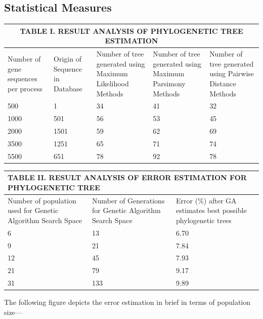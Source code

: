 \documentclass[preprint,12pt]{elsarticle}
\begin{document}
\subsection{Statistical Measures}
\begin{center}

\begin{tabular}{ |p{2.8cm}|p{2.8cm}|p{2.8cm}|p{2.8cm}|p{2.8cm}|  }
 \hline
 \multicolumn{5}{|c|}{\textbf{TABLE I. 	RESULT ANALYSIS OF PHYLOGENETIC TREE ESTIMATION}} \\
 \hline
Number of gene sequences per process & Origin of Sequence in Database&Number of tree generated using Maximum Likelihood Methods&Number of tree generated using Maximum Parsimony Methods& Number of tree generated using Pairwise Distance Methods\\
 \hline
 500 & 1 & 34 & 41 & 32\\
 1000 & 501 & 56 & 53 & 45\\
 2000 & 1501 & 59 & 62 & 69\\
 3500 & 1251 & 65 & 71 & 74\\
 5500 & 651 & 78 & 92 & 78\\
 \hline
\end{tabular}
\end{center}
\begin{center}

\begin{tabular}{ |p{4cm}|p{4cm}|p{4cm}|}
 \hline
 \multicolumn{3}{|p{12cm}|}{\textbf{TABLE II. RESULT ANALYSIS OF  ERROR ESTIMATION FOR PHYLOGENETIC TREE}} \\
 \hline
Number of population used for Genetic Algorithm Search Space & Number of Generations for Genetic Algorithm Search Space & Error (\%) after GA estimates best possible phylogenetic trees\\
 \hline
6 & 13 & 6.70\\
9 & 21 & 7.84\\
12 & 45 & 7.93\\
21 & 79 & 9.17\\
31 & 133 & 9.89\\
 \hline
\end{tabular}
\end{center}
The following figure depicts the error estimation in brief in terms of population size---
\end{document}
